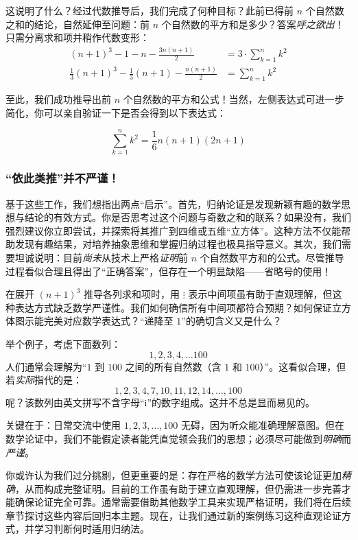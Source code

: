 这说明了什么？经过代数推导后，我们完成了何种目标？此前已得前 $n$ 个自然数之和的结论，自然延伸至问题：前 $n$ 个自然数的平方和是多少？答案\emph{呼之欲出}！只需分离求和项并稍作代数变形：
\begin{align*}
    (n+1)^3-1-n-\frac{3n(n+1)}{2} &= 3 \cdot \sum_{k=1}^{n}k^2 \\
    \frac{1}{3}(n+1)^3 - \frac{1}{3}(n+1) - \frac{n(n+1)}{2} &= \sum_{k=1}^{n}k^2
\end{align*}

至此，我们成功推导出前 $n$ 个自然数的平方和公式！当然，左侧表达式可进一步简化，你可以亲自验证一下是否会得到以下表达式：

\[\sum_{k=1}^{n}k^2 = \frac{1}{6}n(n+1)(2n+1) \]

\subsubsection*{``依此类推''并不严谨！}

基于这些工作，我们想指出两点``启示''。首先，归纳论证是发现新颖有趣的数学思想与结论的有效方式。你是否思考过这个问题与奇数之和的联系？如果没有，我们强烈建议你立即尝试，并探索将其推广到四维或五维``立方体''。这种方法不仅能帮助发现有趣结果，对培养抽象思维和掌握归纳过程也极具指导意义。其次，我们需要坦诚说明：目前\emph{尚未}从技术上严格\emph{证明}前 $n$ 个自然数平方和的公式。尽管推导过程看似合理且得出了``正确答案''，但存在一个明显缺陷——省略号的使用！

在展开 $(n + 1)^3$ 推导各列求和项时，用 $\vdots$ 表示中间项虽有助于直观理解，但这种表达方式缺乏数学严谨性。我们如何确信所有中间项都符合预期？如何保证立方体图示能完美对应数学表达式？``递降至 $1$''的确切含义又是什么？

举个例子，考虑下面数列：
\[1,2,3,4,\dots 100\]
人们通常会理解为``$1$ 到 $100$ 之间的所有自然数（含 $1$ 和 $100$）''。这看似合理，但若\emph{实际}指代的是：
\[1, 2, 3, 4, 7, 10, 11, 12, 14, \dots , 100\]
呢？该数列由英文拼写不含字母``i''的数字组成。这并不总是显而易见的。

关键在于：日常交流中使用 $1,2,3,\dots,100$ 无碍，因为听众能准确理解意图。但在数学论证中，我们不能假定读者能凭直觉领会我们的思想；必须尽可能做到\emph{明确}而\emph{严谨}。

你或许认为我们过分挑剔，但更重要的是：存在严格的数学方法可使该论证更加\emph{精确}，从而构成完整证明。目前的工作虽有助于建立直观理解，但仍需进一步完善才能确保论证完全可靠。通常需要借助其他数学工具来实现严格证明，我们将在后续章节探讨这些内容后回归本主题。现在，让我们通过新的案例练习这种直观论证方式，并学习判断何时适用归纳法。
